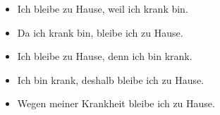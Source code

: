 \documentclass[a4paper]{article}
\begin{document}
        \begin{itemize}
            \item Ich bleibe zu Hause, weil ich krank bin.
            \item Da ich krank bin, bleibe ich zu Hause.
            \item Ich bleibe zu Hause, denn ich bin krank.
            \item Ich bin krank, deshalb bleibe ich zu Hause.
            \item Wegen meiner Krankheit bleibe ich zu Hause.
        \end{itemize}
    
\end{document}
